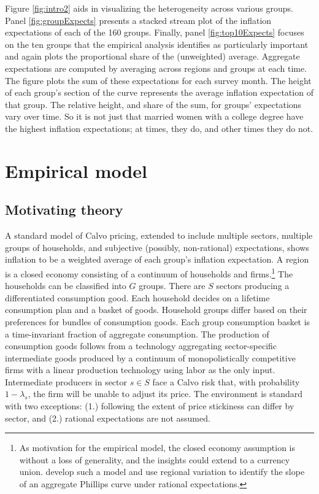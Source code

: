 \documentclass[12pt]{article}
\begin{document}
Figure \ref{fig:intro2} aids in visualizing the heterogeneity across various groups. Panel \ref{fig:groupExpects} presents a stacked stream plot of the inflation expectations of each of the 160 groups. Finally, panel \ref{fig:top10Expects} focuses on the ten groups that the empirical analysis identifies as particularly important and again plots the proportional share of the (unweighted) average. Aggregate expectations are computed by averaging across regions and groups at each time. The figure plots the sum of these expectations for each survey month. The height of each group's section of the curve represents the average inflation expectation of that group. The relative height, and share of the sum, for groups' expectations vary over time. So it is not just that married women with a college degree have the highest inflation expectations; at times, they do, and other times they do not. 

\section{Empirical model}

\subsection{Motivating theory}

A standard model of Calvo pricing, extended to include multiple sectors, multiple groups of households, and subjective (possibly, non-rational) expectations, shows inflation to be a weighted average of each group's inflation expectation. A region is a closed economy consisting of a continuum of households and firms.\footnote{As motivation for the empirical model, the closed economy assumption is without a loss of generality, and the insights could extend to a currency union. \cite{NakamuraSteinsson:QJE2022} develop such a model and use regional variation to identify the slope of an aggregate Phillips curve under rational expectations.} The households can be classified into $G$ groups. There are $S$ sectors producing a differentiated consumption good. Each household decides on a lifetime consumption plan and a basket of goods. Household groups differ based on their preferences for bundles of consumption goods. Each group consumption basket is a time-invariant fraction of aggregate consumption. The production of consumption goods follows from a technology aggregating sector-specific intermediate goods produced by a continuum of monopolistically competitive firms with a linear production technology using labor as the only input. Intermediate producers in sector $s\in S$ face a Calvo risk that, with probability $1-\lambda_s$, the firm will be unable to adjust its price. The environment is standard with two exceptions: (1.) following \cite{Cravinoetal:JME2020} the extent of price stickiness can differ by sector, and (2.) rational expectations are not assumed.
\end{document}
